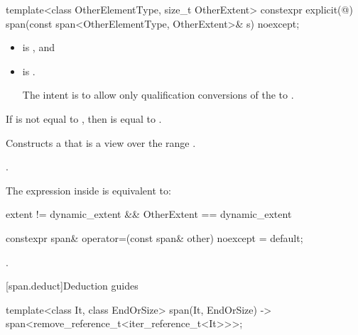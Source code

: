 %
\begin{itemdecl}
template<class OtherElementType, size_t OtherExtent>
  constexpr explicit(@\seebelow@) span(const span<OtherElementType, OtherExtent>& s) noexcept;
\end{itemdecl}

\begin{itemdescr}
\pnum
\constraints
\begin{itemize}
\item {} \tcode{||}  \tcode{||}  is , and
\item {} is .
\begin{note}
The intent is to allow only qualification conversions
of the  to .
\end{note}
\end{itemize}

\pnum
\expects
If  is not equal to ,
then  is equal to .

\pnum
\effects
Constructs a  that is a view over the range
.

\pnum
\ensures
{}.

\pnum
\remarks
The expression inside  is equivalent to:
\begin{codeblock}
extent != dynamic_extent && OtherExtent == dynamic_extent
\end{codeblock}
\end{itemdescr}

%
\begin{itemdecl}
constexpr span& operator=(const span& other) noexcept = default;
\end{itemdecl}

\begin{itemdescr}
\pnum
\ensures
{}.
\end{itemdescr}

[span.deduct]{Deduction guides}

%
\begin{itemdecl}
template<class It, class EndOrSize>
  span(It, EndOrSize) -> span<remove_reference_t<iter_reference_t<It>>>;
\end{itemdecl}

